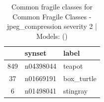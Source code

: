 \begin{table}
\caption{Common fragile classes for Common Fragile Classes - jpeg_compression severity 2 | Models: ()}
\label{tab:Common Fragile Classes - jpeg_compression severity 2_d41d8cd9}
\begin{tabular}{cll}
\toprule
 & synset & label \\
\midrule
849 & n04398044 & teapot \\
37 & n01669191 & box_turtle \\
6 & n01498041 & stingray \\
\bottomrule
\end{tabular}
\end{table}
